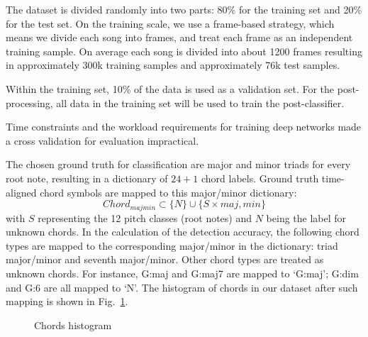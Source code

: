 \documentclass{article}
\begin{document}
The dataset is divided randomly into two parts: 80\% for the training set and 20\% for the test set. On the training scale, we use a frame-based strategy, which means we divide each song into frames, and treat each frame as an independent training sample. On average each song is divided into about 1200 frames resulting in approximately 300k training samples and approximately 76k test samples. 

Within the training set, 10\% of the data is used as a validation set. For the post-processing, all data in the training set will be used to train the post-classifier.

Time constraints and the workload requirements for training deep networks made a cross validation for evaluation impractical. 

The chosen ground truth for classification are major and minor triads for every root note, resulting in a dictionary of $24+1$ chord labels.
Ground truth time-aligned chord symbols are mapped to this major/minor dictionary:
\begin{equation}
Chord_{majmin} \subset \{N\} \cup \{S \times {maj,min}\}
\end{equation}
with $S$ representing the 12 pitch classes (root notes) and $N$ being the label for unknown chords. In the calculation of the detection accuracy, the following chord types are mapped to the corresponding major/minor in the dictionary: triad major/minor and seventh major/minor. Other chord types are treated as unknown chords. For instance, G:maj and G:maj7 are mapped to `G:maj'; G:dim and G:6 are all mapped to `N'. The histogram of chords in our dataset after such mapping is shown in Fig.~\ref{fig:distrib}. 
\begin{figure}
 \centerline{}
 \caption{Chords histogram}
 \label{fig:distrib}
\end{figure}
\end{document}
